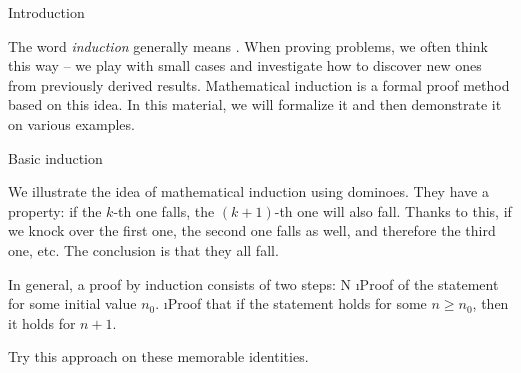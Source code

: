 





\sec Introduction

The word \textit{induction} generally means . When proving problems, we often think this way -- we play with small cases and investigate how to discover new ones from previously derived results. Mathematical induction is a formal proof method based on this idea. In this material, we will formalize it and then demonstrate it on various examples.

\sec Basic induction

We illustrate the idea of mathematical induction using dominoes. They have a property: if the $k$-th one falls, the $(k+1)$-th one will also fall. Thanks to this, if we knock over the first one, the second one falls as well, and therefore the third one, etc. The conclusion is that they all fall. 


In general, a proof by induction consists of two steps:
\begitems \style N
\i Proof of the statement for some initial value $n_0$.
\i Proof that if the statement holds for some $n \ge n_0$, then it holds for $n+1$.
\enditems

Try this approach on these memorable identities.

